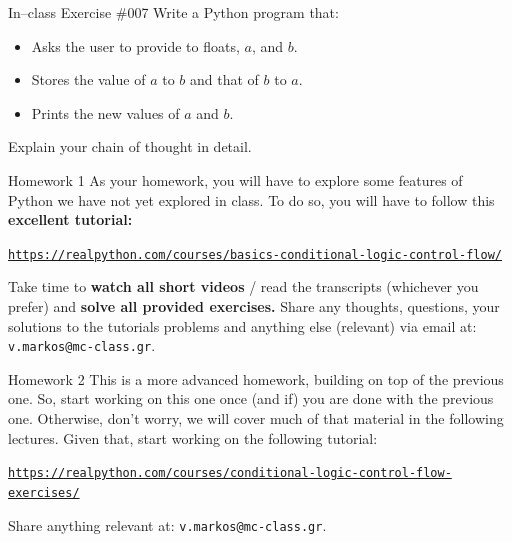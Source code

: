 \documentclass[aspectratio=169, 12pt, xcolor=table]{beamer}
\newcommand{\ohref}[1]{\href{#1}{\texttt{#1}}}
\begin{document}
	\begin{frame}{In--class Exercise \#007}
		Write a Python program that:
		\begin{itemize}
			\item Asks the user to provide to floats, $a$, and $b$.
			\item Stores the value of $a$ to $b$ and that of $b$ to $a$.
			\item Prints the new values of $a$ and $b$.
		\end{itemize}
		Explain your chain of thought in detail.
	\end{frame}

	\begin{frame}{Homework 1}
		As your homework, you will have to explore some features of Python we have not yet explored in class. To do so, you will have to follow this \textbf{excellent tutorial:}
		\begin{center}
			\small\vspace{-1.2\topsep}
			\ohref{https://realpython.com/courses/basics-conditional-logic-control-flow/}
		\end{center}
		Take time to \textbf{watch all short videos} / read the transcripts (whichever you prefer) and \textbf{solve all provided exercises.} Share any thoughts, questions, your solutions to the tutorials problems and anything else (relevant) via email at: \texttt{v.markos@mc-class.gr}.
	\end{frame}

	\begin{frame}{Homework 2}
		This is a more advanced homework, building on top of the previous one. So, start working on this one once (and if) you are done with the previous one. Otherwise, don't worry, we will cover much of that material in the following lectures. Given that, start working on the following tutorial:
		\begin{center}
			\footnotesize\vspace{-1.2\topsep}
			\ohref{https://realpython.com/courses/conditional-logic-control-flow-exercises/}
		\end{center}
		Share anything relevant at: \texttt{v.markos@mc-class.gr}.
	\end{frame}
\end{document}
